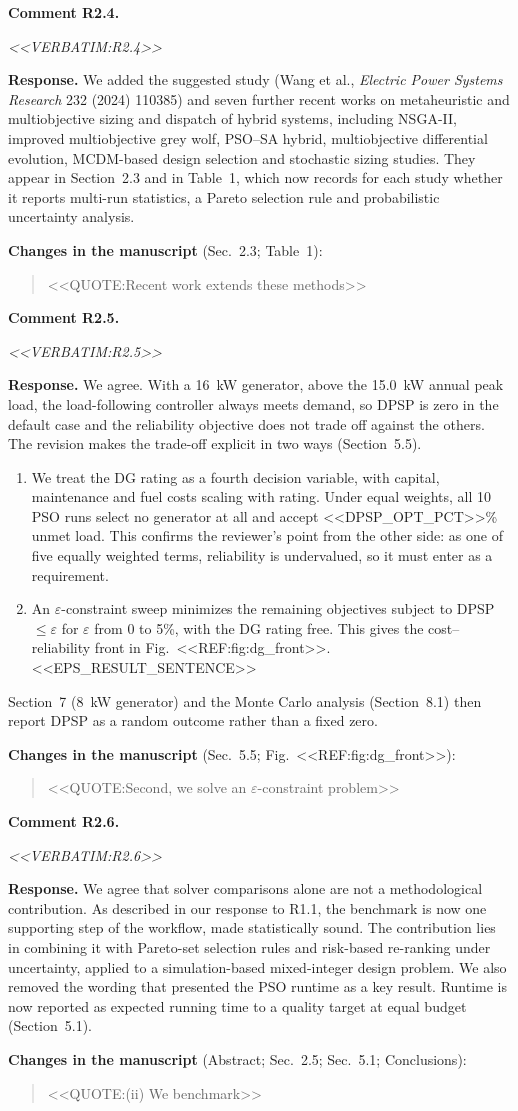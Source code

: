 \documentclass[11pt]{article}
\newcounter{rc}
\newcommand{\rcomment}[2]{\stepcounter{rc}\par\medskip
  \noindent\textbf{Comment #1.}\par
  {\color{commentgrey}\itshape #2\par}}
\newcommand{\response}[1]{\par\noindent\textbf{Response.} #1\par}
\newcommand{\change}[2]{\par\noindent\textbf{Changes in the manuscript} (#1):\par
  \begin{quote}\color{revblue}#2\end{quote}}
\begin{document}
\rcomment{R2.4}{<<VERBATIM:R2.4>>}
\response{We added the suggested study (Wang et al., \textit{Electric Power Systems Research} 232 (2024) 110385) and seven further recent works on metaheuristic and multiobjective sizing and dispatch of hybrid systems, including NSGA-II, improved multiobjective grey wolf, PSO--SA hybrid, multiobjective differential evolution, MCDM-based design selection and stochastic sizing studies. They appear in Section~2.3 and in Table~1, which now records for each study whether it reports multi-run statistics, a Pareto selection rule and probabilistic uncertainty analysis.}
\change{Sec.~2.3; Table~1}{<<QUOTE:Recent work extends these methods>>}

\rcomment{R2.5}{<<VERBATIM:R2.5>>}
\response{We agree. With a 16~kW generator, above the 15.0~kW annual peak load, the load-following controller always meets demand, so DPSP is zero in the default case and the reliability objective does not trade off against the others. The revision makes the trade-off explicit in two ways (Section~5.5).
\begin{enumerate}[leftmargin=*,itemsep=1pt]
\item We treat the DG rating as a fourth decision variable, with capital, maintenance and fuel costs scaling with rating. Under equal weights, all 10 PSO runs select no generator at all and accept <<DPSP_OPT_PCT>>\% unmet load. This confirms the reviewer's point from the other side: as one of five equally weighted terms, reliability is undervalued, so it must enter as a requirement.
\item An $\varepsilon$-constraint sweep minimizes the remaining objectives subject to DPSP $\le\varepsilon$ for $\varepsilon$ from 0 to 5\%, with the DG rating free. This gives the cost--reliability front in Fig.~<<REF:fig:dg_front>>. <<EPS_RESULT_SENTENCE>>
\end{enumerate}
Section~7 (8~kW generator) and the Monte Carlo analysis (Section~8.1) then report DPSP as a random outcome rather than a fixed zero.}
\change{Sec.~5.5; Fig.~<<REF:fig:dg_front>>}{<<QUOTE:Second, we solve an $\varepsilon$-constraint problem>>}

\rcomment{R2.6}{<<VERBATIM:R2.6>>}
\response{We agree that solver comparisons alone are not a methodological contribution. As described in our response to R1.1, the benchmark is now one supporting step of the workflow, made statistically sound. The contribution lies in combining it with Pareto-set selection rules and risk-based re-ranking under uncertainty, applied to a simulation-based mixed-integer design problem. We also removed the wording that presented the PSO runtime as a key result. Runtime is now reported as expected running time to a quality target at equal budget (Section~5.1).}
\change{Abstract; Sec.~2.5; Sec.~5.1; Conclusions}{<<QUOTE:(ii) We benchmark>>}
\end{document}
